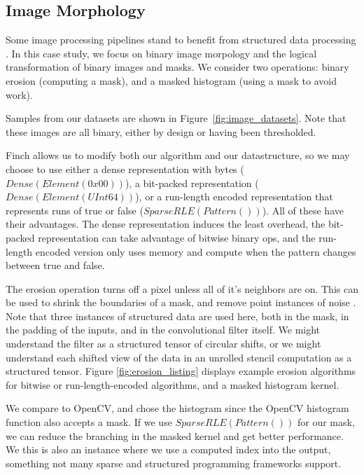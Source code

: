 \subsection{Image Morphology}

Some image processing pipelines stand to benefit from structured data processing \cite{donenfeld_unified_2022}.
In this case study, we focus on binary image morpology and the logical transformation of binary images and masks.
We consider two operations: binary erosion (computing a mask), and a masked histogram (using a mask to avoid work).

Samples from our datasets are shown in Figure~\ref{fig:image_datasets}. Note that these images are all binary, either by design or having been thresholded.

Finch allows us to modify both our algorithm and our datastructure, so we may choose to use either a dense representation with bytes ($Dense(Element(0x00))$), a bit-packed representation ($Dense(Element(UInt64))$), or a run-length encoded representation that represents runs of true or false ($SparseRLE(Pattern())$).
%
All of these have their advantages.
%
The dense representation induces the least overhead, the bit-packed representation can take advantage of bitwise binary ops, and the run-length encoded version only uses memory and compute when the pattern changes between true and false.

The erosion operation turns off a pixel unless all of it's neighbors are on.
%
This can be used to shrink the boundaries of a mask, and remove point instances of noise \cite{fisher_hypermedia_1996}.
%
Note that three instances of structured data are used here, both in the mask, in the padding of the inputs, and in the convolutional filter itself.
%
We might understand the filter as a structured tensor of circular shifts, or we might understand each shifted view of the data in an unrolled stencil computation as a structured tensor.
Figure \ref{fig:erosion_listing} displays example erosion algorithms for bitwise
or run-length-encoded algorithms, and a masked histogram kernel.

We compare to OpenCV, and chose the histogram since the OpenCV histogram function also accepts a mask. If we use $SparseRLE(Pattern())$ for our mask, we can reduce the branching
in the masked kernel and get better performance.
%
We this is also an instance where we use a computed index into the output, something not many sparse and structured programming frameworks support.

